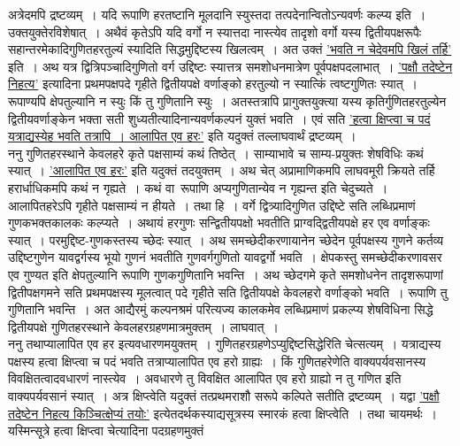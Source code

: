 \documentclass[11pt, openany]{book}
\begin{document}
\newpage

\begin{sloppypar}
अत्रेदमपि द्रष्टव्यम्~। यदि रूपाणि हरतष्टानि मूलदानि स्युस्तदा तत्पदेनान्वितोऽन्यवर्णः कल्प्य इति~। उक्तयुक्तेरविशेषात्~। अथैवं कृतेऽपि यदि वर्गो न स्यात्तदा नास्त्येव तादृशो वर्गो यस्य द्वितीयपक्षरूपैः सहान्तरमेकादिगुणितहरतुल्यं स्यादिति सिद्धमुद्दिष्टस्य खिलत्वम्~। अत उक्तं \hyperref[10.176]{'भवति न चेदेवमपि खिलं तर्हि'} इति~। अथ यत्र द्वित्रिपञ्चादिगुणितो वर्ग उद्दिष्टः स्यात्तत्र समशोधनमात्रेण पूर्वपक्षपदलाभात्~। \hyperref[8.115]{'पक्षौ तदेष्टेन निहत्य'} इत्यादिना प्रथमपक्षपदे गृहीते द्वितीयपक्षे वर्णाङ्को हरतुल्यो न स्यात्किं त्वष्टगुणितः स्यात्~। रूपाण्यपि क्षेपतुल्यानि न स्युः किं तु गुणितानि स्युः~। अतस्तत्रापि प्रागुक्तयुक्त्या यस्य कृतिर्गुणितहरतुल्येन द्वितीयवर्णाङ्केन भक्ता सती शुध्यतीत्यादिनान्यवर्णकल्पनं युक्तं भवति~। एवं सति \hyperref[10.176]{'हत्वा क्षिप्त्वा च पदं यत्राद्यस्येह भवति तत्रापि~। आलापित एव हरः'} इति यदुक्तं तल्लाघवार्थं द्रष्टव्यम्~।\\

ननु गुणितहरस्थाने केवलहरे कृते पक्षसाम्यं कथं तिष्ठेत्~। साम्याभावे च साम्य-प्रयुक्तः शेषविधिः कथं स्यात्~। \hyperref[10.176]{'आलापित एव हरः'} इति यदुक्तं तदयुक्तम्~। अथ चेत् अप्रामाणिकमपि लाघवमूरी क्रियते तर्हि हरार्धाधिकमपि कथं न गृह्यते~। कथं वा~रूपाणि अप्यगुणितान्येव न गृह्यन्त इति चेदुच्यते~। आलापितहरेऽपि गृहीते पक्षसाम्यं न हीयते~। तथा हि~। वर्गे द्वित्र्यादिगुणित उद्दिष्टे सति लब्धिप्रमाणं गुणकभक्तकालकः कल्प्यते~। अथायं हरगुणः सन्द्वितीयपक्षो भवतीति प्राग्वद्द्वितीयपक्षे हर एव वर्णाङ्कः स्यात्~। परमुद्दिष्ट-गुणकस्तस्य च्छेदः स्यात्~। अथ समच्छेदीकरणायानेन च्छेदेन पूर्वपक्षस्य गुणने कर्तव्य उद्दिष्टगुणेन यावद्वर्गस्य भूयो गुणनं भवतीति गुणवर्गगुणितो यावद्वर्गो भवति~। क्षेपकस्तु समच्छेदीकरणावसर एव गुण्यत इति क्षेपतुल्यानि रूपाणि गुणकगुणितानि भवन्ति~। अथ च्छेदगमे कृते समशोधनेन तादृशरूपाणां द्वितीपक्षगमने सति प्रथमपक्षस्य मूलत्वात् पदे गृहीते सति द्वितीयपक्षे केवलहरो वर्णाङ्को भवति~। रूपाणि तु गुणितानि भवन्ति~। अत आद्यैरमुं कल्पनश्रमं परित्यज्य कालकमेव लब्धिप्रमाणं प्रकल्प्य शेषविधिना सिद्धे द्वितीयपक्षे गुणितहरस्थाने केवलहरग्रहणमात्रमुक्तम्~। लाघवात्~।\\

ननु तथाप्यालापित एव हर इत्यवधारणमयुक्तम्~। गुणितहरग्रहणेऽप्युद्दिष्टसिद्धेरिति चेत्सत्यम्~। यत्राद्यस्य पक्षस्य हत्वा क्षिप्त्वा च पदं भवति तत्राप्यालापित एव हरो ग्राह्यः~। किं गुणितहरेणेति वाक्यपर्यवसानस्य विवक्षितत्वादवधारणं नास्त्येव~। अवधारणे तु विवक्षित आलापित एव हरो ग्राह्यो न तु गणित इति वाक्यपर्यवसानं स्यात्~। अत्र क्षिप्त्वेति यदुक्तं तत्प्रथमराशौ सरूपे कल्पिते सतीति द्रष्टव्यम्~। यद्वा \hyperref[8.115]{'पक्षौ तदेष्टेन निहत्य किञ्चित्क्षेप्यं तयोः'} इत्येतदर्थकस्याद्यसूत्रस्य स्मारकं हत्वा क्षिप्त्वेति~। तथा चायमर्थः~। यस्मिन्सूत्रे हत्वा क्षिप्त्वा चेत्यादिना पदग्रहणमुक्तं
\end{sloppypar}
\end{document}
